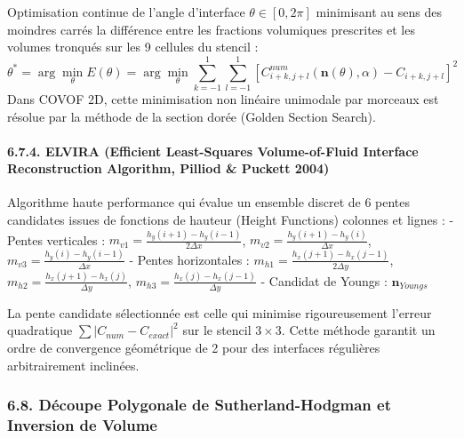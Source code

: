 \documentclass[
  french,
]{article}
\begin{document}
Optimisation continue de l'angle d'interface \(\theta \in [0, 2\pi]\)
minimisant au sens des moindres carrés la différence entre les fractions
volumiques prescrites et les volumes tronqués sur les 9 cellules du
stencil :
\[\theta^* = \arg\min_{\theta} E(\theta) = \arg\min_{\theta} \sum_{k=-1}^1 \sum_{l=-1}^1 \left[ C_{i+k, j+l}^{num}(\mathbf{n}(\theta), \alpha) - C_{i+k, j+l} \right]^2\]
Dans COVOF 2D, cette minimisation non linéaire unimodale par morceaux
est résolue par la méthode de la section dorée (Golden Section Search).

\paragraph{6.7.4. ELVIRA (Efficient Least-Squares Volume-of-Fluid
Interface Reconstruction Algorithm, Pilliod \& Puckett
2004)}\label{elvira-efficient-least-squares-volume-of-fluid-interface-reconstruction-algorithm-pilliod-puckett-2004}

Algorithme haute performance qui évalue un ensemble discret de 6 pentes
candidates issues de fonctions de hauteur (Height Functions) colonnes et
lignes : - Pentes verticales :
\(m_{v1} = \frac{h_y(i+1) - h_y(i-1)}{2\Delta x}\),
\(m_{v2} = \frac{h_y(i+1) - h_y(i)}{\Delta x}\),
\(m_{v3} = \frac{h_y(i) - h_y(i-1)}{\Delta x}\) - Pentes horizontales :
\(m_{h1} = \frac{h_x(j+1) - h_x(j-1)}{2\Delta y}\),
\(m_{h2} = \frac{h_x(j+1) - h_x(j)}{\Delta y}\),
\(m_{h3} = \frac{h_x(j) - h_x(j-1)}{\Delta y}\) - Candidat de Youngs :
\(\mathbf{n}_{Youngs}\)

La pente candidate sélectionnée est celle qui minimise rigoureusement
l'erreur quadratique \(\sum |C_{num} - C_{exact}|^2\) sur le stencil
\(3 \times 3\). Cette méthode garantit un ordre de convergence
géométrique de 2 pour des interfaces régulières arbitrairement
inclinées.

\subsubsection{6.8. Découpe Polygonale de Sutherland-Hodgman et
Inversion de
Volume}\label{duxe9coupe-polygonale-de-sutherland-hodgman-et-inversion-de-volume}
\end{document}
